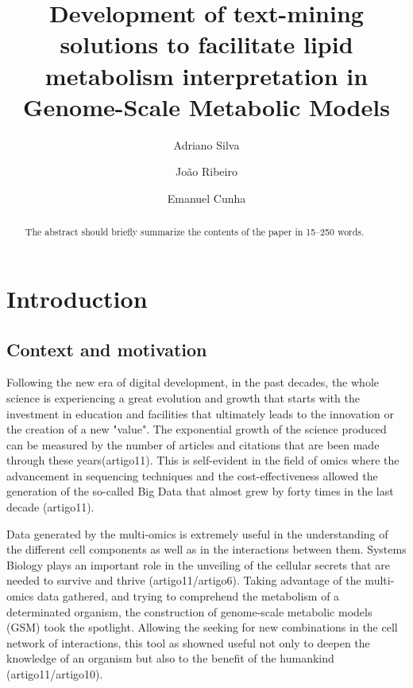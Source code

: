 \documentclass{llncs}
\begin{document}
\pagestyle{myheadings}
\title{Development of text-mining solutions to facilitate lipid metabolism interpretation in Genome-Scale Metabolic Models}

\author{Adriano Silva\and
João Ribeiro\and
Emanuel Cunha}

%
\maketitle              %
%
\begin{abstract}
The abstract should briefly summarize the contents of the paper in
15--250 words.

\end{abstract}
%
%
%
\section{Introduction}
\subsection{Context and motivation}
Following the new era of digital development, in the past decades, the whole science is experiencing a great evolution and growth that starts with the investment in education and facilities that ultimately leads to the innovation or the creation of a new "value". 
The exponential growth of the science produced can be measured by the number of articles and citations that are been made through these years\cite{Artigo1}(artigo11).
This is self-evident in the field of omics where the advancement in sequencing techniques and the cost-effectiveness allowed the generation of the so-called Big Data that almost grew by forty times in the last decade \cite{Artigo2}(artigo11). 

Data generated by the multi-omics is extremely useful in the understanding of the different cell 
components as well as in the interactions between them. Systems Biology plays an important 
role in the unveiling of the cellular secrets that are needed to survive and thrive (artigo11/artigo6).
Taking advantage of the multi-omics data gathered, and trying to comprehend the metabolism of a determinated organism,
the construction of genome-scale metabolic models (GSM) took the spotlight. Allowing the seeking for new combinations in the cell network of interactions, this tool as showned useful not only 
to deepen the knowledge of an organism but also to the benefit of the humankind (artigo11/artigo10).
\end{document}
